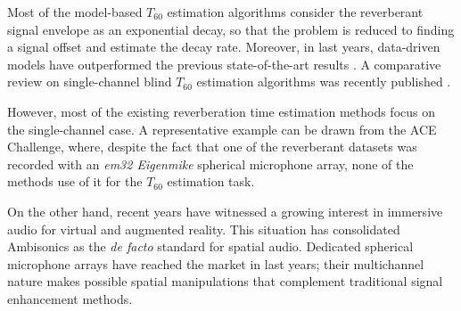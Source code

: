Most of the model-based $T_{60}$ estimation algorithms consider the reverberant signal envelope as an exponential decay, so that the problem is reduced to finding a signal offset and estimate the decay rate. 
Moreover, in last years, data-driven models have outperformed the previous state-of-the-art results \cite{gamper2018blind, looney2020joint, bryan2020impulse}.
A comparative review on single-channel blind $T_{60}$ estimation algorithms was recently published \cite{lollmann2019comparative}. 

However, most of the existing reverberation time estimation methods focus on the single-channel case. A representative example can be drawn from the ACE Challenge, where, despite the fact that one of the reverberant datasets was recorded with an \textit{em32 Eigenmike} spherical microphone array, none of the methods use of it for the $T_{60}$ estimation task. 


On the other hand, recent years have witnessed a growing interest in immersive audio for virtual and augmented reality.
This situation has consolidated Ambisonics \cite{zotter2019ambisonics} as the \textit{de facto} standard for spatial audio. Dedicated spherical microphone arrays have reached the market in last years; their multichannel nature makes possible spatial manipulations that 
complement traditional signal enhancement methods.

